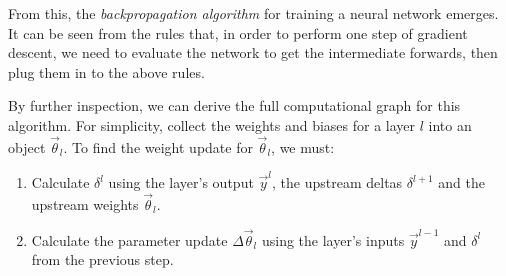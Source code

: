 

From this, the \textit{backpropagation algorithm} for training a neural network emerges.
It can be seen from the rules that, in order to perform one step of gradient descent, we need to evaluate the network to get the intermediate forwards, then plug them in to the above rules.

By further inspection, we can derive the full computational graph for this algorithm.
For simplicity, collect the weights and biases for a layer \(l\) into an object \(\vec{\theta}_l\).
To find the weight update for \(\vec{\theta}_l\), we must:

\begin{enumerate}[topsep=0.2em]
    \item Calculate \(\delta^l\) using the layer's output \(\vec{y}^l\), the upstream deltas \(\delta^{l+1}\) and the upstream weights \(\vec{\theta}_l\).
    \item Calculate the parameter update \(\Delta\vec{\theta}_l\) using the layer's inputs \(\vec{y}^{l-1}\) and \(\delta^l\) from the previous step.
\end{enumerate}

